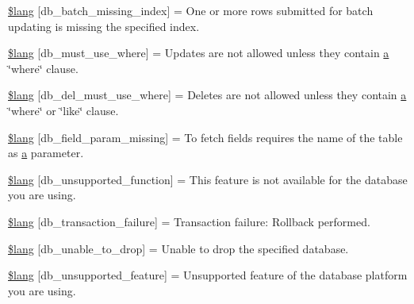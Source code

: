 \begin{DoxyCompactItemize}
\item 
\hyperlink{db__lang_8php_af946769a3dd5679c60e6f2ef5f7a5aa1}{\$lang} \mbox{[}\textquotesingle{}db\+\_\+batch\+\_\+missing\+\_\+index\textquotesingle{}\mbox{]} = \textquotesingle{}One or more rows submitted for batch updating is missing the specified index.\textquotesingle{}
\item 
\hyperlink{db__lang_8php_add4bfc65af76fda2c48fa6a2e8d2e506}{\$lang} \mbox{[}\textquotesingle{}db\+\_\+must\+\_\+use\+\_\+where\textquotesingle{}\mbox{]} = \textquotesingle{}Updates are not allowed unless they contain \hyperlink{assets_2js_2bootstrap_8min_8js_a1f5870dcf487187f13d5fd328ed9e6e7}{a} \char`\"{}where\char`\"{} clause.\textquotesingle{}
\item 
\hyperlink{db__lang_8php_a256ae2de791e589ddc23012f74f390ea}{\$lang} \mbox{[}\textquotesingle{}db\+\_\+del\+\_\+must\+\_\+use\+\_\+where\textquotesingle{}\mbox{]} = \textquotesingle{}Deletes are not allowed unless they contain \hyperlink{assets_2js_2bootstrap_8min_8js_a1f5870dcf487187f13d5fd328ed9e6e7}{a} \char`\"{}where\char`\"{} or \char`\"{}like\char`\"{} clause.\textquotesingle{}
\item 
\hyperlink{db__lang_8php_a9101352a8cd8c8f34a6b8b1e30c45d8a}{\$lang} \mbox{[}\textquotesingle{}db\+\_\+field\+\_\+param\+\_\+missing\textquotesingle{}\mbox{]} = \textquotesingle{}To fetch fields requires the name of the table as \hyperlink{assets_2js_2bootstrap_8min_8js_a1f5870dcf487187f13d5fd328ed9e6e7}{a} parameter.\textquotesingle{}
\item 
\hyperlink{db__lang_8php_a77c256be8532e23e8463481f51732116}{\$lang} \mbox{[}\textquotesingle{}db\+\_\+unsupported\+\_\+function\textquotesingle{}\mbox{]} = \textquotesingle{}This feature is not available for the database you are using.\textquotesingle{}
\item 
\hyperlink{db__lang_8php_a35f225a7ead01f13f8c6423b7c7433a0}{\$lang} \mbox{[}\textquotesingle{}db\+\_\+transaction\+\_\+failure\textquotesingle{}\mbox{]} = \textquotesingle{}Transaction failure\+: Rollback performed.\textquotesingle{}
\item 
\hyperlink{db__lang_8php_af391f0d50d64cbb95cd733fa947fdb5e}{\$lang} \mbox{[}\textquotesingle{}db\+\_\+unable\+\_\+to\+\_\+drop\textquotesingle{}\mbox{]} = \textquotesingle{}Unable to drop the specified database.\textquotesingle{}
\item 
\hyperlink{db__lang_8php_ac9a47dcf094e785346ea1834e63df941}{\$lang} \mbox{[}\textquotesingle{}db\+\_\+unsupported\+\_\+feature\textquotesingle{}\mbox{]} = \textquotesingle{}Unsupported feature of the database platform you are using.\textquotesingle{}

\end{DoxyCompactItemize}
